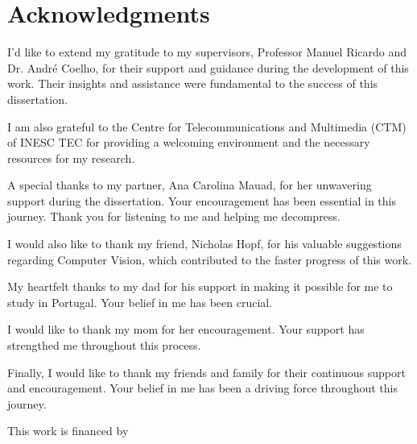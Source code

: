 \chapter*{Acknowledgments}


\vspace{10mm}
I'd like to extend my gratitude to my supervisors, Professor Manuel Ricardo and Dr. André Coelho, for their support and guidance during the development of this work. Their insights and assistance were fundamental to the success of this dissertation.

I am also grateful to the Centre for Telecommunications and Multimedia (CTM) of INESC TEC for providing a welcoming environment and the necessary resources for my research.

A special thanks to my partner, Ana Carolina Mauad, for her unwavering support during the dissertation. Your encouragement has been essential in this journey. Thank you for listening to me and helping me decompress.

I would also like to thank my friend, Nicholas Hopf, for his valuable suggestions regarding Computer Vision, which contributed to the faster progress of this work.

My heartfelt thanks to my dad for his support in making it possible for me to study in Portugal. Your belief in me has been crucial.

I would like to thank my mom for her encouragement. Your support has strengthed me throughout this process.

Finally, I would like to thank my friends and family for their continuous support and encouragement. Your belief in me has been a driving force throughout this journey.


This work is financed by
